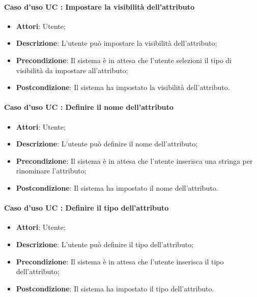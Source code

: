 \documentclass[../AnalisiDeiRequisiti.tex]{subfiles}
\begin{document}
		\paragraph{Caso d'uso UC : Impostare la visibilità dell'attributo}
			\begin{itemize}
				\item \textbf{Attori}: Utente;
				\item \textbf{Descrizione}: L'utente può impostare la visibilità
				dell'attributo;
				\item \textbf{Precondizione}: Il sistema è in attesa che l'utente selezioni il
				tipo di visibilità da impostare all'attributo;
				\item \textbf{Postcondizione}: Il sistema ha impostato la visibilità
				dell'attributo.
			\end{itemize}
		\paragraph{Caso d'uso UC : Definire il nome dell'attributo}
			\begin{itemize}
				\item \textbf{Attori}: Utente;
				\item \textbf{Descrizione}: L'utente può definire il nome dell'attributo;
				\item \textbf{Precondizione}: Il sistema è in attesa che l'utente inserisca
				una stringa per rinominare l'attributo;
				\item \textbf{Postcondizione}: Il sistema ha impostato il nome
				dell'attributo.
			\end{itemize}
		\paragraph{Caso d'uso UC : Definire il tipo dell'attributo}
			\begin{itemize}
				\item \textbf{Attori}: Utente;
				\item \textbf{Descrizione}: L'utente può definire il tipo dell'attributo;
				\item \textbf{Precondizione}: Il sistema è in attesa che l'utente inserisca
				il tipo dell'attributo;
				\item \textbf{Postcondizione}: Il sistema ha impostato il tipo dell'attributo.
			\end{itemize}
\end{document}
